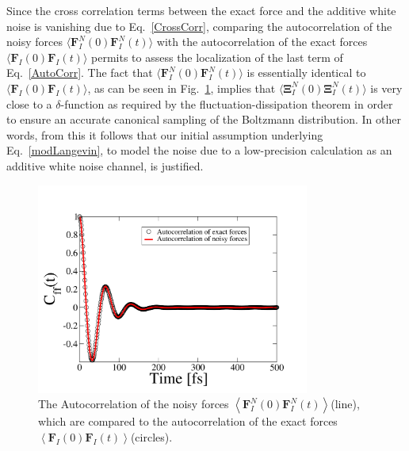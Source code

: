 \documentclass[preprint]{elsarticle}
\begin{document}
Since the cross correlation terms between the exact force and the additive white noise is vanishing due to Eq.~\ref{CrossCorr}, comparing the autocorrelation of the noisy forces $\langle \textbf{F}_{I}^{N}(0)\textbf{F}_{I}^{N}(t)\rangle$ with the autocorrelation of the exact forces $\langle \textbf{F}_{I}(0) \textbf{F}_{I}(t)\rangle$ permits to assess the localization of the last term of Eq.~\ref{AutoCorr}.
The fact that $\langle \textbf{F}_{I}^{N}(0)\textbf{F}_{I}^{N}(t)\rangle$ is essentially identical to $\langle \textbf{F}_{I}(0) \textbf{F}_{I}(t)\rangle$, as can be seen in Fig.~\ref{Fig4}, implies that $\langle \mathbf{\Xi } _{I}^{N}(0) \mathbf{\Xi } _{I}^{N}(t)\rangle$ is very close to a $\delta$-function as required by the fluctuation-dissipation theorem in order to ensure an accurate canonical sampling of the Boltzmann distribution. In other words, from this it follows that our initial assumption underlying Eq.~\ref{modLangevin}, to model the noise due to a low-precision calculation as an additive white noise channel, is justified.
\begin{figure}
\begin{center}
\includegraphics[width=0.8\textwidth]
{AutocorrelationPlot_n.pdf}
\end{center}
\caption{\label{Fig4}
The Autocorrelation of the noisy forces \(
\left \langle \textbf{F}_{I}^{N}\left ( 0 \right ) \textbf{F}_{I}^{N}\left ( t \right )\right \rangle \)(line), which are compared to the autocorrelation of the exact forces \( \left \langle \textbf{F}_{I}\left ( 0 \right ) \textbf{F}_{I}\left ( t \right )\right \rangle \)(circles).
} \end{figure}

\end{document}
